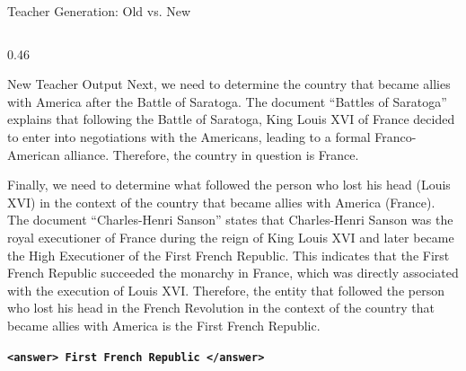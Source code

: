 \begin{frame}{Teacher Generation: Old vs. New}
\begin{columns}[T,onlytextwidth]
\begin{column}{0.46\textwidth}
\begin{block}{New Teacher Output}
Next, we need to determine the country that became allies with America
after the Battle of Saratoga. The document ``Battles of Saratoga''
explains that following the Battle of Saratoga, King Louis XVI of France
decided to enter into negotiations with the Americans, leading to a
formal Franco-American alliance. Therefore, the country in question
is France.

Finally, we need to determine what followed the person who lost his
head (Louis XVI) in the context of the country that became allies
with America (France). The document ``Charles-Henri Sanson'' states
that Charles-Henri Sanson was the royal executioner of France during
the reign of King Louis XVI and later became the High Executioner of
the First French Republic. This indicates that the First French
Republic succeeded the monarchy in France, which was directly
associated with the execution of Louis XVI. Therefore, the entity
that followed the person who lost his head in the French Revolution
in the context of the country that became allies with America is
the First French Republic.

\vspace{0.1cm}

\begin{center}
    \textbf{\texttt{<answer> First French Republic </answer>}}
\end{center}
\end{block}

\end{column}

\end{columns}

\end{frame}
